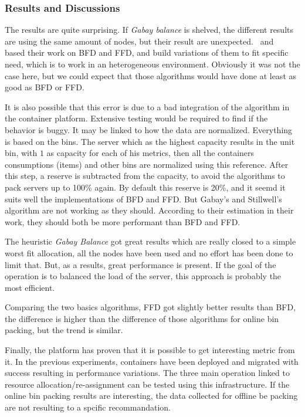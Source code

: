 \subsubsection{Results and Discussions}

The results are quite surprising. If \textit{Gabay balance} is shelved, the
different results are using the same amount of nodes, but their result are
unexpected.~\cite{allocationHeterogeneous} and~\cite{variableSizeBinPacking}
based their work on BFD and FFD, and build variations of them to fit specific
need, which is to work in an heterogeneous environment. Obviously it was not
the case here, but we could expect that those algorithms would have done at
least as good as BFD or FFD\@.

It is also possible that this error is due to a bad integration of the
algorithm in the container platform. Extensive testing would be required to
find if the behavior is buggy. It may be linked to how the data are normalized.
Everything is based on the bins. The server which as the highest capacity
results in the unit bin, with $1$ as capacity for each of his metrics, then all
the containers consumptions (items) and other bins are normalized using this
reference.  After this step, a reserve is subtracted from the capacity, to
avoid the algorithms to pack servers up to 100\% again. By default this reserve
is 20\%, and it seemd it suits well the implementations of BFD and FFD\@. But
Gabay's and Stillwell's algorithm are not working as they should. According to
their estimation in their work, they should both be more performant than BFD
and FFD\@.

The heuristic \textit{Gabay Balance} got great results which are really closed
to a simple worst fit allocation, all the nodes have been used and no effort
has been done to limit that. But, as a results, great performance is present.
If the goal of the operation is to balanced the load of the server, this approach
is probably the most efficient.

Comparing the two basics algorithms, FFD got slightly better results than BFD,
the difference is higher than the difference of those algorithms for online bin
packing, but the trend is similar. 

\vspace{1em}

Finally, the platform has proven that it is possible to get interesting metric
from it. In the previous experiments, containers have been deployed and
migrated with success resulting in performance variations. The three main
operation linked to resource allocation/re-assignment can be tested using this
infrastructure. If the online bin packing results are interesting, the data
collected for offline be packing are not resulting to a spcific recommandation.
